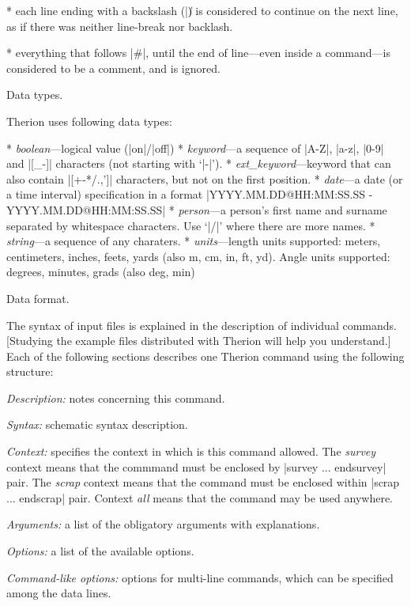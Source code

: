 * each line ending with a backslash (|\|) is considered to continue on 
  the next line, as if there was neither line-break nor backlash.

* everything that follows |#|, until the end of line---even inside a command---is 
  considered to be a comment, and is ignored.
\endlist


\subchapter Data types.

Therion uses following data types:

\list
* {\it boolean}---logical value (|on|/|off|)
* {\it keyword}---a sequence of |A-Z|, |a-z|, |0-9| and |[_-]| characters 
             (not starting with `|-|').
* {\it ext\_keyword}---keyword that can also contain |[+-*/.,']| characters, but not
                 on the first position.
* {\it date}---a date (or a time interval) specification in a format\hfil\break
          |YYYY.MM.DD@HH:MM:SS.SS - YYYY.MM.DD@HH:MM:SS.SS|
* {\it person}---a person's first name and surname separated by whitespace characters.
            Use `|/|' where there are more names.
* {\it string}---a sequence of any charaters.
* {\it units}---length units supported: meters, centimeters, inches, feets, yards
           (also m, cm, in, ft, yd).
           Angle units supported: degrees, minutes, grads (also deg, min)
\endlist


\subchapter Data format.

The syntax of input files is explained in the description of
individual commands. [Studying the example files distributed with
Therion will help you understand.]  Each of the following sections describes
one Therion command using the following structure:

{\it Description:} notes concerning this command.

{\it Syntax:} schematic syntax description. 

{\it Context:} specifies the context in which is this command allowed. 
The {\it survey} context means that the commmand must be enclosed by 
|survey ... endsurvey| pair. The {\it scrap} context means that the command must be 
enclosed within |scrap ... endscrap| pair. Context {\it all} means that 
the command may be used anywhere.

{\it Arguments:} a list of the obligatory arguments with explanations.

{\it Options:} a list of the available options.

{\it Command-like options:} options for multi-line commands, which can be specified 
   among the data lines.

